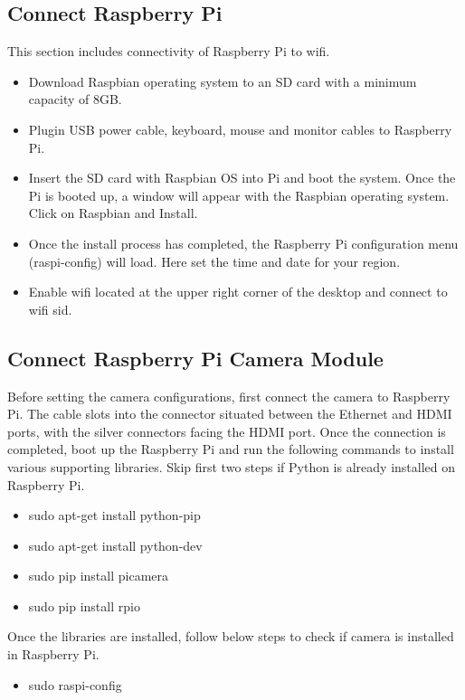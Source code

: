 \documentclass[sigconf]{acmart}
\begin{document}
\subsection{Connect Raspberry Pi}
This section includes connectivity of Raspberry Pi to wifi. 

\begin{itemize}
\item Download Raspbian operating system to an SD card with a minimum capacity of 8GB.
\item Plugin USB power cable, keyboard, mouse and monitor cables to Raspberry Pi.
\item Insert the SD card with Raspbian OS into Pi and boot the system. Once the Pi is booted up, a window will appear with the Raspbian operating system. Click on Raspbian and Install.
\item Once the install process has completed, the Raspberry Pi configuration menu (raspi-config) will load. Here set the time and date for your region.
\item Enable wifi located at the upper right corner of the desktop and connect to wifi sid.
\end{itemize}


\subsection{Connect Raspberry Pi Camera Module}
Before setting the camera configurations, first connect the camera to Raspberry Pi. The cable slots into the connector situated between the Ethernet and HDMI ports, with the silver connectors facing the HDMI port. Once the connection is completed, boot up the Raspberry Pi and run the following commands to install various supporting libraries. Skip first two steps if Python is already installed on Raspberry Pi.

\begin{itemize}
\item sudo apt-get install python-pip
\item sudo apt-get install python-dev
\item sudo pip install picamera
\item sudo pip install rpio
\end{itemize}

Once the libraries are installed, follow below steps to check if camera is installed in Raspberry Pi.
\begin{itemize}
\item sudo raspi-config
\end{itemize}
\end{document}
